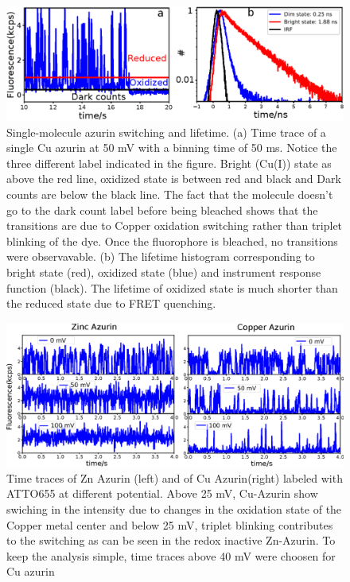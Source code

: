 \documentclass[11pt,a4paper,onecolumn]{article}
\begin{document}
\begin{figure}
  \centering
  \includegraphics{lifetime.eps}
  \makeatletter
  \renewcommand{\fnum@figure}{\figurename~S\thefigure}
  \makeatother
  \caption{Single-molecule azurin switching and lifetime. (a) Time trace of a single Cu azurin at 50 mV with a binning time of 50 ms. Notice the three different label indicated in the figure. Bright (Cu(I)) state as above the red line, oxidized state is between red and black and Dark counts are below the black line. The fact that the molecule doesn't go to the dark count label before being bleached shows that the transitions are due to Copper oxidation switching rather than triplet blinking of the dye. Once the fluorophore is bleached, no transitions were observavable. (b) The lifetime histogram corresponding to bright state (red), oxidized state (blue) and instrument response function (black). The lifetime of oxidized state is much shorter than the reduced state due to FRET quenching.}
  \label{SIfig: lifetime}
\end{figure}
\begin{figure}
  \centering
  \includegraphics[width=\textwidth,keepaspectratio]{SI_timetrace_Zn_Cu.eps}
	\makeatletter
	\renewcommand{\fnum@figure}{\figurename~S\thefigure}
	\makeatother
  \caption{Time traces of Zn Azurin (left) and of Cu Azurin(right) labeled with ATTO655 at different potential.  Above 25 mV, Cu-Azurin show swiching in the intensity due to changes in the oxidation state of the Copper metal center and below 25 mV, triplet blinking contributes to the switching as can be seen in the redox inactive Zn-Azurin. To keep the analysis simple, time traces above 40 mV were choosen for Cu azurin}
  \label{SIfig:tracecomparision}
\end{figure}
\end{document}
